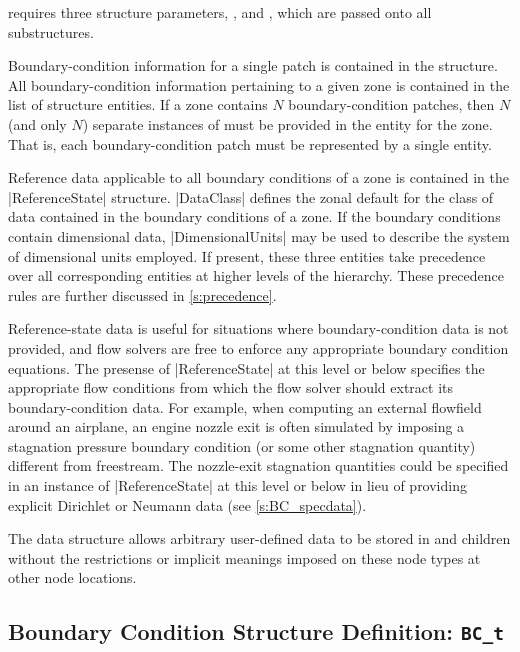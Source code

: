  requires three structure parameters, ,
 and , which are passed
onto all  substructures.

Boundary-condition information for a single patch is contained in the
 structure.
All boundary-condition information pertaining to a given zone is
contained in the list of  structure entities.
If a zone contains $N$ boundary-condition patches, then $N$ (and
only $N$) separate instances of  must be provided in the
 entity for the zone.
That is, each boundary-condition patch must be represented by a single
 entity.

Reference data applicable to all boundary conditions of a zone is
contained in the |ReferenceState| structure.  |DataClass| defines the
zonal default for the class of data contained in the boundary conditions
of a zone.  If the boundary conditions contain dimensional data,
|DimensionalUnits| may be used to describe the system of dimensional
units employed.  If present, these three entities take precedence over
all corresponding entities at higher levels of the hierarchy.  These
precedence rules are further discussed in \autoref{s:precedence}.

Reference-state data is useful for situations where boundary-condition
data is not provided, and flow solvers are free to enforce any
appropriate boundary condition equations.  The presense of
|ReferenceState| at this level or below specifies the appropriate
flow conditions from which the flow solver should extract its
boundary-condition data.
For example, when computing an external flowfield around an airplane, an
engine nozzle exit is often simulated by imposing a stagnation pressure
boundary condition (or some other stagnation quantity) different from
freestream.
The nozzle-exit
stagnation quantities could be specified in an instance of
|ReferenceState| at this level or below in lieu of providing explicit
Dirichlet or Neumann data (see \autoref{s:BC_specdata}).

The  data structure allows arbitrary
user-defined data to be stored in  and
 children without the restrictions or implicit
meanings imposed on these node types at other node locations.

\subsection{Boundary Condition Structure Definition: \texttt{BC\_t}}
\label{s:BCdefn}

